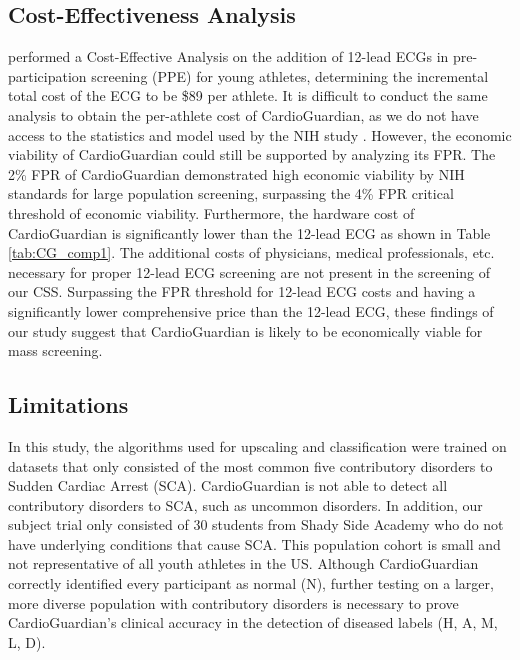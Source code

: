 \documentclass[
	a4paper, 
	10pt, 
	twoside, 
]{LTJournalArticle}
\begin{document}
\subsection{Cost-Effectiveness Analysis}
\textcite{Wheeler2010} performed a Cost-Effective Analysis on the addition of 12-lead ECGs in pre-participation screening (PPE) for young athletes, determining the incremental total cost of the ECG to be \$89 per athlete. It is difficult to conduct the same analysis to obtain the per-athlete cost of CardioGuardian, as we do not have access to the statistics and model used by the NIH study \cite{Wheeler2010}. However, the economic viability of CardioGuardian could still be supported by analyzing its FPR. The 2\% FPR of CardioGuardian demonstrated high economic viability by NIH standards \cite{Wheeler2010} for large population screening, surpassing the 4\% FPR critical threshold of economic viability. Furthermore, the hardware cost of CardioGuardian is significantly lower than the 12-lead ECG as shown in Table \ref{tab:CG_comp1}. The additional costs of physicians, medical professionals, etc. necessary for proper 12-lead ECG screening are not present in the screening of our CSS. Surpassing the FPR threshold for 12-lead ECG costs and having a significantly lower comprehensive price than the 12-lead ECG, these findings of our study suggest that CardioGuardian is likely to be economically viable for mass screening. 




\subsection{Limitations}
In this study, the algorithms used for upscaling and classification were trained on datasets that only consisted of the most common five contributory disorders to Sudden Cardiac Arrest (SCA). CardioGuardian is not able to detect all contributory disorders to SCA, such as uncommon disorders. In addition, our subject trial only consisted of 30 students from Shady Side Academy who do not have underlying conditions that cause SCA. This population cohort is small and not representative of all youth athletes in the US. Although CardioGuardian correctly identified every participant as normal (N), further testing on a larger, more diverse population with contributory disorders is necessary to prove CardioGuardian's clinical accuracy in the detection of diseased labels (H, A, M, L, D). 
\end{document}
